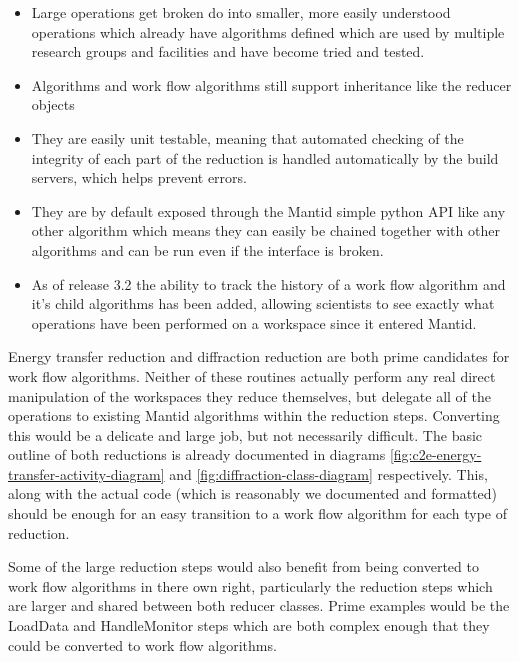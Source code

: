 \documentclass[paper=a4, fontsize=11pt]{scrartcl}	%
\numberwithin{equation}{section}															%
\numberwithin{figure}{section}																%
\numberwithin{table}{section}																%
\begin{document}
\begin{itemize}
\item Large operations get broken do into smaller, more easily understood operations which already have algorithms defined which are used by multiple research groups and facilities and have become tried and tested.

\item Algorithms and work flow algorithms still support inheritance like the reducer objects

\item They are easily unit testable, meaning that automated checking of the integrity of each part of the reduction is handled automatically by the build servers, which helps prevent errors.

\item They are by default exposed through the Mantid simple python API like any other algorithm which means they can easily be chained together with other algorithms and can be run even if the interface is broken.

\item As of release 3.2 the ability to track the history of a work flow algorithm and it's child algorithms has been added, allowing scientists to see exactly what operations have been performed on a workspace since it entered Mantid.
\end{itemize}

Energy transfer reduction and diffraction reduction are both prime candidates for work flow algorithms. Neither of these routines actually perform any real direct manipulation of the workspaces they reduce themselves, but delegate all of the operations to existing Mantid algorithms within the reduction steps. Converting this would be a delicate and large job, but not necessarily difficult. The basic outline of both reductions is already documented in diagrams \ref{fig:c2e-energy-transfer-activity-diagram} and \ref{fig:diffraction-class-diagram} respectively. This, along with the actual code (which is reasonably we documented and formatted) should be enough for an easy transition to a work flow algorithm for each type of reduction.

Some of the large reduction steps would also benefit from being converted to work flow algorithms in there own right, particularly the reduction steps which are larger and shared between both reducer classes. Prime examples would be the LoadData and HandleMonitor steps which are both complex enough that they could be converted to work flow algorithms.
\end{document}
